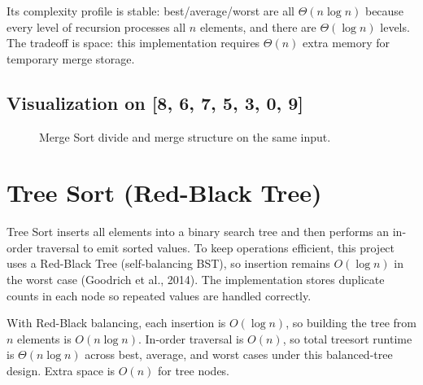 \documentclass[12pt]{article}
\begin{document}
Its complexity profile is stable: best/average/worst are all $\Theta(n \log n)$ because every level of recursion processes all $n$ elements, and there are $\Theta(\log n)$ levels. The tradeoff is space: this implementation requires $\Theta(n)$ extra memory for temporary merge storage.

\subsection*{Visualization on [8, 6, 7, 5, 3, 0, 9]}
\begin{figure}[H]
\centering
{}
\caption{Merge Sort divide and merge structure on the same input.}
\end{figure}

\section{Tree Sort (Red-Black Tree)}
Tree Sort inserts all elements into a binary search tree and then performs an in-order traversal to emit sorted values. To keep operations efficient, this project uses a Red-Black Tree (self-balancing BST), so insertion remains $O(\log n)$ in the worst case (Goodrich et al., 2014). The implementation stores duplicate counts in each node so repeated values are handled correctly.

With Red-Black balancing, each insertion is $O(\log n)$, so building the tree from $n$ elements is $O(n \log n)$. In-order traversal is $O(n)$, so total treesort runtime is $\Theta(n \log n)$ across best, average, and worst cases under this balanced-tree design. Extra space is $O(n)$ for tree nodes.
\end{document}
